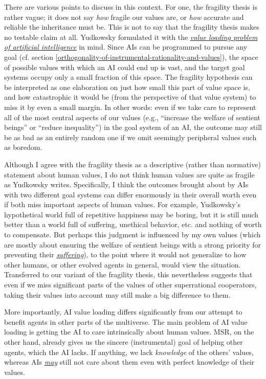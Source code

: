 There are various points to discuss in this context. For one, the
fragility thesis is rather vague; it does not say \emph{how} fragile our
values are, or \emph{how} accurate and reliable the inheritance must be.
This is not to say that the fragility thesis makes no testable claim at
all. Yudkowsky formulated it with the
\href{http://lesswrong.com/lw/llr/superintelligence_20_the_valueloading_problem/}{\emph{value
loading problem of artificial intelligence}} in mind. Since AIs can be
programmed to pursue any goal (cf. section
\ref{orthogonality-of-instrumental-rationality-and-values}), the space of possible
values with which an AI could end up is vast, and the target goal
systems occupy only a small fraction of this space. The fragility
hypothesis can be interpreted as one elaboration on just how small this
part of value space is, and how catastrophic it would be (from the
perspective of that value system) to miss it by even a small margin. In
other words: even if we take care to represent all of the most central
aspects of our values (e.g., ``increase the welfare of sentient beings''
or ``reduce inequality'') in the goal system of an AI, the outcome may
still be as bad as an entirely random one if we omit seemingly
peripheral values such as boredom.

Although I agree with the fragility thesis as a descriptive (rather than
normative) statement about human values, I do not think human values are
quite as fragile as Yudkowsky writes. Specifically, I think the outcomes
brought about by AIs with two different goal systems can differ
enormously in their overall worth even if both miss important aspects of
human values. For example, Yudkowsky's hypothetical world full of
repetitive happiness may be boring, but it is still much better than a
world full of suffering, unethical behavior, etc. and nothing of worth
to compensate. But perhaps this judgment is influenced by my own values
(which are mostly about ensuring the welfare of sentient beings with a
strong priority for preventing their
\href{https://foundational-research.org/the-case-for-suffering-focused-ethics/}{\emph{suffering}}),
to the point where it would not generalize to how other humans, or other
evolved agents in general, would view the situation. Transferred to our
variant of the fragility thesis, this nevertheless suggests that even if
we miss significant parts of the values of other superrational
cooperators, taking their values into account may still make a big
difference to them.

More importantly, AI value loading differs significantly from our
attempt to benefit agents in other parts of the multiverse. The main
problem of AI value loading is getting the AI to care intrinsically
about human values. MSR, on the other hand, already gives us the sincere
(instrumental) goal of helping other agents, which the AI lacks. If
anything, we lack \emph{knowledge} of the others' values, whereas AIs
\href{http://lesswrong.com/lw/igf/the_genie_knows_but_doesnt_care/}{\emph{may}}
still not care about them even with perfect knowledge of their values.

